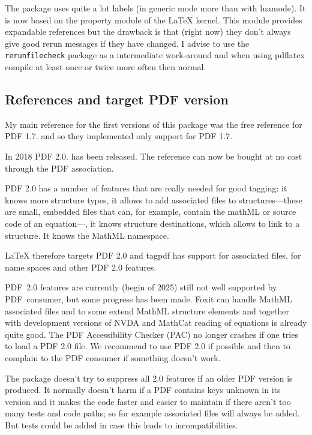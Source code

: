 \documentclass[bibliography=totoc,a4paper]{article}
\newcommand\pkg[1]{\texttt{#1}}
\newcommand\PDF{PDF}
\begin{document}
The package uses quite a lot labels (in generic mode more than with luamode). 
It is now based on the property module of the \LaTeX{} kernel. This module 
provides expandable references but the drawback is that (right now) they don't always give 
good rerun messages if they have changed. I advise to use the 
\pkg{rerunfilecheck} package as a intermediate work-around and when using 
pdflatex compile at least once or twice more often then normal. 


\subsection{References and target PDF version}

My main reference for the first versions of this package was the free 
reference for \PDF{} 1.7. \parencite{pdfreference} and so they implemented 
only support for \PDF{} 1.7. 

In 2018 \PDF{} 2.0. has been released. The reference can now be bought at no 
cost through the PDF association. 

\PDF{} 2.0 has a number of features that are really needed for good tagging: 
it knows more structure types, it allows to add associated files to 
structures---these are small, embedded files that can, for example, contain 
the mathML or source code of an equation---, it knows structure destinations, 
which allows to link to a structure. It knows the MathML namespace. 

\LaTeX{} therefore targets \PDF{} 2.0 and tagpdf has support for 
associated files, for name spaces and other \PDF{} 2.0 features.

\PDF{}~2.0 features are currently (begin of 2025) still not well supported by 
\PDF~consumer, but some progress has been made. Foxit can handle MathML associated files
and to some extend MathML structure elements and
together with development versions of NVDA and MathCat reading of equations is already quite good. The PDF Accessibility Checker (PAC) no longer crashes 
if one tries to load a \PDF{} 2.0 file. We recommend 
to use \PDF{} 2.0 if possible and then to complain to the PDF{} consumer if 
something doesn't work.   

The package doesn't try to suppress all 2.0 features if an older \PDF{} 
version is produced. It normally doesn't harm if a \PDF{} contains keys 
unknown in its version and it makes the code faster and easier to maintain if 
there aren't too many tests and code paths; so for example associated files 
will always be added. But tests could be added in case this leads to 
incompatibilities. 
\end{document}
